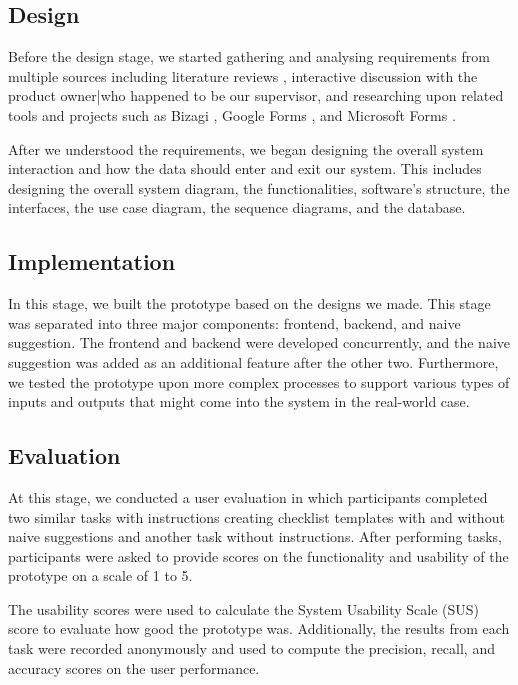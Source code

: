 \subsection{Design}
Before the design stage, we started gathering and analysing requirements from multiple sources including literature reviews \cite{checklistdesign, papapanagiotou2017workflowfm}, interactive discussion with the product owner|who happened to be our supervisor, and researching upon related tools and projects such as Bizagi \cite{bizagi}, Google Forms \cite{googleforms}, and Microsoft Forms \cite{msforms}.

After we understood the requirements, we began designing the overall system interaction and how the data should enter and exit our system. This includes designing the overall system diagram, the functionalities, software's structure, the interfaces, the use case diagram, the sequence diagrams, and the database.


\subsection{Implementation}
In this stage, we built the prototype based on the designs we made. This stage was separated into three major components: frontend, backend, and naive suggestion. The frontend and backend were developed concurrently, and the naive suggestion was added as an additional feature after the other two. Furthermore, we tested the prototype upon more complex processes to support various types of inputs and outputs that might come into the system in the real-world case.



\subsection{Evaluation}
At this stage, we conducted a user evaluation in which participants completed two similar tasks with instructions creating checklist templates with and without naive suggestions and another task without instructions. After performing tasks, participants were asked to provide scores on the functionality and usability of the prototype on a scale of 1 to 5.

The usability scores were used to calculate the System Usability Scale (SUS) score \cite{susscores} to evaluate how good the prototype was. Additionally, the results from each task were recorded anonymously and used to compute the precision, recall, and accuracy scores \cite{rocanalysis} on the user performance.

